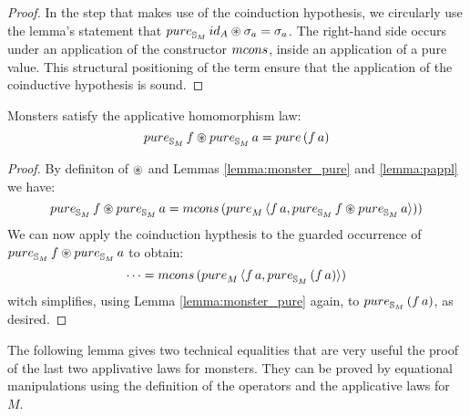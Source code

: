 \begin{proof}
{In the step that makes use of the coinduction hypothesis, we circularly use the lemma's statement that $\apure_{\stream{M}}\,\id_A \appl \sigma_a = \sigma_a$.
The right-hand side occurs under an application of the constructor $\mcons$, inside an application of a pure value. 
This structural positioning of the term ensure that the application of the coinductive hypothesis is sound.}
\end{proof}

\begin{lemma}
Monsters satisfy the applicative homomorphism law:
$$
\apure_{\stream{M}}\,f \appl \apure_{\stream{M}}\,a = \apure\,(f\,a)
$$

\end{lemma}
\begin{proof}
By definiton of $\circledast$ and Lemmas \ref{lemma:monster_pure} and \ref{lemma:pappl} we have:
$$
\apure_{\stream{M}}\,f \appl \apure_{\stream{M}}\,a
= \mcons\,(\apure_M\,\langle f\, a, \apure_{\stream{M}}\,f \appl \apure_{\stream{M}}\,a \rangle))
$$
We can now apply the coinduction hypthesis to the guarded occurrence of $\apure_{\stream{M}}\,f \appl \apure_{\stream{M}}\,a$ to obtain:
$$
\cdots = \mcons\,(\apure_M\,\langle f\,a, \apure_{\stream{M}}\,(f\,a)\rangle)
$$
witch simplifies, using Lemma \ref{lemma:monster_pure} again, to $\apure_{\stream{M}}\,(f\,a)$, as desired.
\end{proof}

The following lemma gives two technical equalities that are very useful the proof of the last two applivative laws for monsters.
They can be proved by equational manipulations using the definition of the operators and the applicative laws for $M$.

